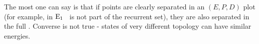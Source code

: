 The most one can say is that if points are clearly separated in an
$(E,P,D)$ plot (for example, in 
$\mathrm{E}_{1}$ \eqv\ is not part of the recurrent set), they are also separated
in the full \statesp. Converse is not true - states of
very different topology can have similar energies.
